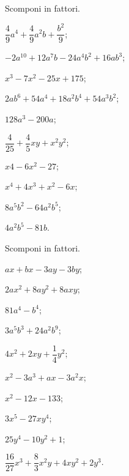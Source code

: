 \begin{esercizio}
 \label{ese:13.104}
 Scomponi in fattori.
 \begin{multicols}{2}
 \begin{enumeratea}
  \item $\dfrac{4}{9}a^{4}+\dfrac{4}{9}a^{2}b+\dfrac{b^{2}}{9}$;
\item $-2a^{10}+12a^{7}b-24a^{4}b^{2}+16{ab}^{3}$;
\item $x^{3}-7x^{2}-25x+175$;
\item $2ab^{6}+54a^{4}+18a^{2}b^{4}+54a^{3}b^{2}$;
\item $128a^{3}-200a$;
\item $\dfrac{4}{25}+\dfrac{4}{5}xy+x^{2}y^{2}$;
\item $x{4}-6x^{2}-27$;
\item $x^{4}+4x^{3}+x^{2}-6x$;
\item $8a^{5}b^{2}-64a^{2}b^{5}$;
\item $4a^{2}b^{5}-81b$.
 \end{enumeratea}
 \end{multicols}
\end{esercizio}
\begin{esercizio}
 \label{ese:13.105}
 Scomponi in fattori.
 \begin{multicols}{2}
 \begin{enumeratea}
  \item $ax + bx - 3ay - 3by $;
\item $2ax^{2} + 8ay^{2} + 8axy$;
\item $81a^{4} - b^{4}$;
\item $3a^{5}b^{3} + 24a^{2}b^{9}$;
\item $4x^{2} + 2xy +\dfrac{1}{4}y^{2}$;
\item $x^{2} - 3a^{3} + ax - 3a^{2}x $;
\item $x^{2}-12x-133$;
\item $3x^{5} - 27xy^{4}$;
\item $25y^{4} - 10y^{2}+1$;
\item $\dfrac{16}{27}x^{3}+\dfrac{8}{3}x^{2}y+4xy^{2}+2y^{3}$.
 \end{enumeratea}
 \end{multicols}
\end{esercizio}

